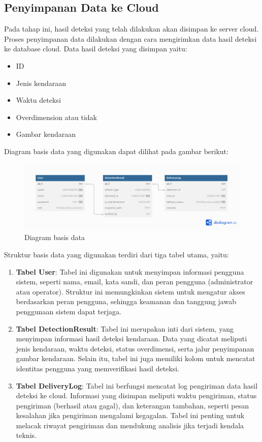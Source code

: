 \subsection{Penyimpanan Data ke Cloud}

Pada tahap ini, hasil deteksi yang telah dilakukan akan disimpan ke server cloud. Proses penyimpanan data dilakukan dengan cara mengirimkan data hasil deteksi ke database cloud. Data hasil deteksi yang disimpan yaitu:

\begin{itemize}
  \item ID
  \item Jenis kendaraan
  \item Waktu deteksi
  \item Overdimension atau tidak
  \item Gambar kendaraan
\end{itemize}

Diagram basis data yang digunakan dapat dilihat pada gambar berikut:

\begin{figure}[H]
  \centering

  \includegraphics[scale=0.39]{gambar/bab3-basis-data.png}

  \caption{Diagram basis data}
  \label{fig:dbdiagram}
\end{figure}

Struktur basis data yang digunakan terdiri dari tiga tabel utama, yaitu:

\begin{enumerate}[nolistsep]

  \item \textbf{Tabel User}: Tabel ini digunakan untuk menyimpan informasi pengguna sistem, seperti nama, email, kata sandi, dan peran pengguna (administrator atau operator). Struktur ini memungkinkan sistem untuk mengatur akses berdasarkan peran pengguna, sehingga keamanan dan tanggung jawab penggunaan sistem dapat terjaga.
  \item \textbf{Tabel DetectionResult}: Tabel ini merupakan inti dari sistem, yang menyimpan informasi hasil deteksi kendaraan. Data yang dicatat meliputi jenis kendaraan, waktu deteksi, status overdimensi, serta jalur penyimpanan gambar kendaraan. Selain itu, tabel ini juga memiliki kolom untuk mencatat identitas pengguna yang memverifikasi hasil deteksi.
  \item \textbf{Tabel DeliveryLog}: Tabel ini berfungsi mencatat log pengiriman data hasil deteksi ke cloud. Informasi yang disimpan meliputi waktu pengiriman, status pengiriman (berhasil atau gagal), dan keterangan tambahan, seperti pesan kesalahan jika pengiriman mengalami kegagalan. Tabel ini penting untuk melacak riwayat pengiriman dan mendukung analisis jika terjadi kendala teknis.
\end{enumerate}

